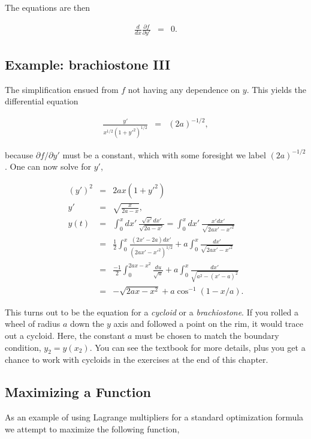 \documentclass[%
oneside,                 %
final,                   %
10pt]{article}
\begin{document}
The equations are then

\begin{eqnarray*}
\frac{d}{dx}\frac{\partial f}{\partial y'}&=&0.
\end{eqnarray*}

\subsection{Example: brachiostone III}

The simplification ensued from $f$ not having any dependence on $y$. This yields the differential equation

\begin{eqnarray}
\frac{y'}{x^{1/2}(1+y'^2)^{1/2}}&=&(2a)^{-1/2},
\end{eqnarray}

because $\partial f/\partial y'$ must be a constant, which with some
foresight we label $(2a)^{-1/2}$. One can now solve for $y'$,

\begin{eqnarray*}
(y')^2&=&2ax(1+y'^2)\\
\nonumber
y'&=&\sqrt{\frac{x}{2a-x}},\\
\nonumber
y(t)&=&\int_0^x dx'~\frac{\sqrt{x'}dx'}{\sqrt{2a-x'}}=\int_0^x dx'~\frac{x'dx'}{\sqrt{2ax'-x'^2}}\\
\nonumber
&=&\frac{1}{2}\int_0^x\frac{(2x'-2a)dx'}{(2ax'-x'^2)^{1/2}}+a\int_0^x\frac{dx'}{\sqrt{2ax'-x'^2}}\\
\nonumber
&=&\frac{-1}{2}\int_0^{2ax-x^2}\frac{du}{\sqrt{u}}+a\int_0^x\frac{dx'}{\sqrt{a^2-(x'-a)^2}}\\
&=&-\sqrt{2ax-x^2}+a\cos^{-1}(1-x/a).
\end{eqnarray*}

This turns out to be the equation for a {\it cycloid} or a {\it
brachiostone}. If you rolled a wheel of radius $a$ down the $y$ axis
and followed a point on the rim, it would trace out a cycloid. Here,
the constant $a$ must be chosen to match the boundary condition,
$y_2=y(x_2)$. You can see the textbook for more details, plus you get
a chance to work with cycloids in the exercises at the end of this
chapter.

\subsection{Maximizing a Function}

As an example of using Lagrange multipliers for a standard
optimization formula we attempt to maximize the following function,
\end{document}
